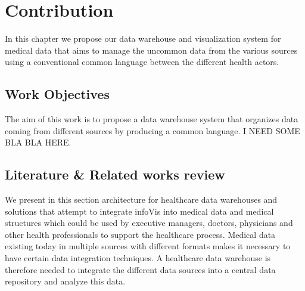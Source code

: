 \chapter{Contribution}
In this chapter we propose our data warehouse and visualization system for medical data that aims to manage the uncommon data from the various sources using a conventional common language between the different health actors.




\section{Work Objectives}
The aim of this work is to propose a data warehouse system that organizes data coming from different sources by producing a common language. I NEED SOME BLA BLA HERE.





\section{Literature \& Related works review}
We present in this section architecture for healthcare data warehouses and solutions that attempt to integrate infoVis into medical data and medical structures which could be used by executive managers, doctors, physicians and other health professionals to support the healthcare process.  Medical data existing today in multiple sources with different formats makes it necessary to have certain data integration techniques. A healthcare data warehouse is therefore needed to integrate the different data sources into a central data repository and analyze this data.

